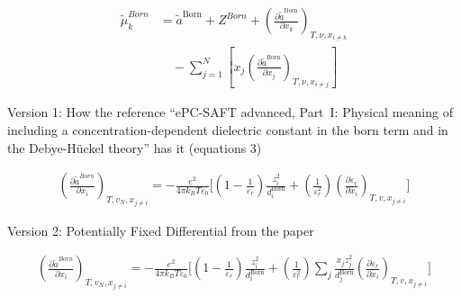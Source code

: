 \documentclass[12pt, letterpaper]{article}
\begin{document}
\begin{equation}
    \begin{aligned}
        \tilde{\mu}^{Born}_{k}
        &=\tilde{a}^{\mathrm{Born}} + Z^{Born}
        +\left(\frac{\partial\tilde{a}^{\mathrm{Born}}}{\partial x_{k}}\right)_{T,\nu,x_{i\neq k}}
        \\
        &\quad -\sum_{j=1}^{N}\left[x_{j}\left(\frac{\partial\tilde{a}^{\mathrm{Born}}}{\partial x_{j}}\right)_{T,\nu,x_{i\neq j}}\right]
    \end{aligned}
    \label{eq:mu_born}
\end{equation}


Version 1:
How the reference ``ePC-SAFT advanced, Part~I\@: Physical meaning of including a concentration-dependent dielectric constant in the born term and in the Debye-H\"uckel theory'' has it (equations 3)~\cite{Bulow2021a}

\begin{equation}
    \begin{aligned}\left(\frac{\partial \tilde{a}^{Born}}{\partial x_{i}}\right)_{T,v_{N},x_{j\neq i}}=-\frac{e^{2}}{4\pi k_{B}T\varepsilon_{0}}\biggl[\left(1-\frac{1}{\varepsilon_{r}}\right)\frac{z_{i}^{2}}{d^{\text{Born}}_{i}} + \left(\frac{1}{\varepsilon_{r}^{2}}\right) \left(\frac{\partial\varepsilon_{r}}{\partial x_{i}}\right)_{T,v,x_{j\neq i}} \biggr]\end{aligned}
    \label{eq:dares_born_dxi_v1}
\end{equation}

Version 2:
Potentially Fixed Differential from the paper

\begin{equation}
    \begin{aligned}\left(\frac{\partial \tilde{a}^{Born}}{\partial x_{i}}\right)_{T,v_{N},x_{j\neq i}}=-\frac{e^{2}}{4\pi k_{B}T\varepsilon_{0}}\biggl[\left(1-\frac{1}{\varepsilon_{r}}\right)\frac{z_{i}^{2}}{d^{\text{Born}}_{i}} + \left(\frac{1}{\varepsilon_{r}^{2}}\right)\sum_{j} \frac{x_{j} z_{j}^2}{d^{\text{Born}}_{j}} \left(\frac{\partial\varepsilon_{r}}{\partial x_{i}}\right)_{T,v,x_{j\neq i}} \biggr]\end{aligned}
    \label{eq:dares_born_dxi_v2}
\end{equation}
\end{document}
